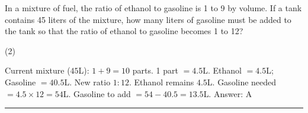 \documentclass[11pt,paper=a4,answers]{exam}
\begin{document}
\begin{questions}
\vspace{1cm}

\question
In a mixture of fuel, the ratio of ethanol to gasoline is 1 to 9 by volume. If a tank contains 45 liters of the mixture, how many liters of gasoline must be added to the tank so that the ratio of ethanol to gasoline becomes 1 to 12?
\begin{tasks}(2)
       
\end{tasks}

\begin{solution}
Current mixture ($45$L): $1+9 = 10$ parts. 1 part $= 4.5$L.
\vspace{5pt}
Ethanol $= 4.5$L; Gasoline $= 40.5$L.
\vspace{5pt}
New ratio $1:12$. Ethanol remains $4.5$L.
\vspace{5pt}
Gasoline needed $= 4.5 \times 12 = 54$L.
\vspace{5pt}
Gasoline to add $= 54 - 40.5 = 13.5$L.
\vspace{5pt}
Answer: \colorbox{yellow!100}{A}
\end{solution}


\end{questions}
\begin{center}
\rule{.5\textwidth}{1pt}
\end{center}
\end{document}
